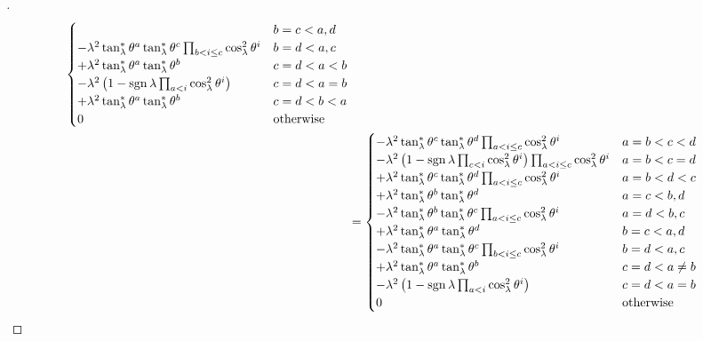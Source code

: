 \documentclass[../main.tex]{subfiles}
\begin{document}
\begin{proof}[]
\begin{align*}
\begin{cases}
&\text{\(b=c<a,d\)}\\
-\lambda^2\tan_\lambda^\ast\tensor{\theta}{^a}\tan_\lambda^\ast\tensor{\theta}{^c}\prod_{b<i\le c}\cos_\lambda^2\tensor{\theta}{^i}
&\text{\(b=d<a,c\)}\\
+\lambda^2\tan_\lambda^\ast\tensor{\theta}{^a}\tan_\lambda^\ast\tensor{\theta}{^b}
&\text{\(c=d<a<b\)}\\
-\lambda^2
\left(
1-\sign{\lambda}\prod_{a<i}\cos_\lambda^2\tensor{\theta}{^i}
\right)
&\text{\(c=d<a=b\)}\\
+\lambda^2\tan_\lambda^\ast\tensor{\theta}{^a}\tan_\lambda^\ast\tensor{\theta}{^b}
&\text{\(c=d<b<a\)}\\
0&\text{otherwise}\\
\end{cases}\\
&=\begin{cases}
-\lambda^2\tan_\lambda^\ast\tensor{\theta}{^c}\tan_\lambda^\ast\tensor{\theta}{^d}\prod_{a<i\le c}\cos_\lambda^2\tensor{\theta}{^i}
&\text{\(a=b<c<d\)}\\
-\lambda^2
\left(
1-\sign{\lambda}\prod_{c<i}\cos_\lambda^2\tensor{\theta}{^i}
\right)
\prod_{a<i\le c}\cos_\lambda^2\tensor{\theta}{^i}
&\text{\(a=b<c=d\)}\\
+\lambda^2\tan_\lambda^\ast\tensor{\theta}{^c}\tan_\lambda^\ast\tensor{\theta}{^d}\prod_{a<i\le c}\cos_\lambda^2\tensor{\theta}{^i}
&\text{\(a=b<d<c\)}\\
+\lambda^2\tan_\lambda^\ast\tensor{\theta}{^b}\tan_\lambda^\ast\tensor{\theta}{^d}
&\text{\(a=c<b,d\)}\\
-\lambda^2\tan_\lambda^\ast\tensor{\theta}{^b}\tan_\lambda^\ast\tensor{\theta}{^c}\prod_{a<i\le c}\cos_\lambda^2\tensor{\theta}{^i}
&\text{\(a=d<b,c\)}\\
+\lambda^2\tan_\lambda^\ast\tensor{\theta}{^a}\tan_\lambda^\ast\tensor{\theta}{^d}
&\text{\(b=c<a,d\)}\\
-\lambda^2\tan_\lambda^\ast\tensor{\theta}{^a}\tan_\lambda^\ast\tensor{\theta}{^c}\prod_{b<i\le c}\cos_\lambda^2\tensor{\theta}{^i}
&\text{\(b=d<a,c\)}\\
+\lambda^2\tan_\lambda^\ast\tensor{\theta}{^a}\tan_\lambda^\ast\tensor{\theta}{^b}
&\text{\(c=d<a\ne b\)}\\
-\lambda^2
\left(
1-\sign{\lambda}\prod_{a<i}\cos_\lambda^2\tensor{\theta}{^i}
\right)
&\text{\(c=d<a=b\)}\\
0&\text{otherwise}\\
\end{cases}\\

\end{align*}
\end{proof}
\end{document}
